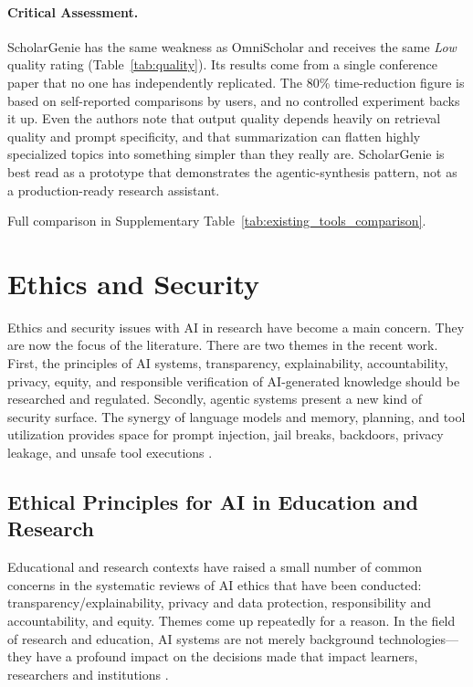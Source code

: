 \documentclass[sn-basic,Numbered]{sn-jnl}
\begin{document}
\paragraph{Critical Assessment.} ScholarGenie has the same weakness as
OmniScholar and receives the same \emph{Low} quality rating
(Table~\ref{tab:quality}). Its results come from a single conference
paper that no one has independently replicated. The 80\% time-reduction
figure is based on self-reported comparisons by users, and no
controlled experiment backs it up. Even the authors note that output quality depends heavily
on retrieval quality and prompt specificity, and that summarization
can flatten highly specialized topics into something simpler than they
really are. ScholarGenie is best read as a prototype that demonstrates
the agentic-synthesis pattern, not as a production-ready research
assistant.

Full comparison in Supplementary Table~\ref{tab:existing_tools_comparison}.

\section{Ethics and Security}
\label{sec:ethicssecurity}
Ethics and security issues with AI in research have become a main concern. They are now the focus of the literature. There are two themes in the recent work. First, the principles of AI systems, transparency, explainability, accountability, privacy, equity, and responsible verification of AI-generated knowledge should be researched and regulated. Secondly, agentic systems present a new kind of security surface. The synergy of language models and memory, planning, and tool utilization provides space for prompt injection, jail breaks, backdoors, privacy leakage, and unsafe tool executions \cite{rojas2024aiethics, resnik2025ethics, li2025agentsecurity, he2025security}.

\subsection{Ethical Principles for AI in Education and Research}

Educational and research contexts have raised a small number of common concerns in the systematic reviews of AI ethics that have been conducted: transparency/explainability, privacy and data protection, responsibility and accountability, and equity. Themes come up repeatedly for a reason. In the field of research and education, AI systems are not merely background technologies—they have a profound impact on the decisions made that impact learners, researchers and institutions \cite{rojas2024aiethics}.
\end{document}
